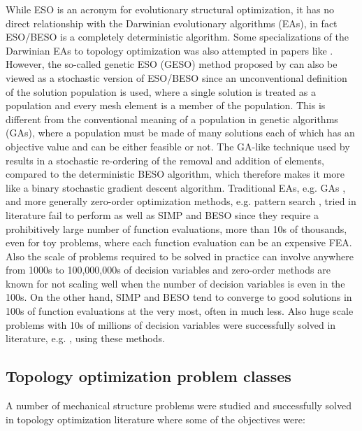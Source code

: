 While ESO is an acronym for evolutionary structural optimization, it has no direct relationship with the Darwinian evolutionary algorithms (EAs), in fact ESO/BESO is a completely deterministic algorithm. Some specializations of the Darwinian EAs to topology optimization was also attempted in papers like \cite{Sandgren1990,Liu2008}. However, the so-called genetic ESO (GESO) method proposed by \cite{Liu2008} can also be viewed as a stochastic version of ESO/BESO since an unconventional definition of the solution population is used, where a single solution is treated as a population and every mesh element is a member of the population. This is different from the conventional meaning of a population in genetic algorithms (GAs), where a population must be made of many solutions each of which has an objective value and can be either feasible or not. The GA-like technique used by \cite{Liu2008} results in a stochastic re-ordering of the removal and addition of elements, compared to the deterministic BESO algorithm, which therefore makes it more like a binary stochastic gradient descent algorithm. Traditional EAs, e.g. GAs \citep{Sandgren1990}, and more generally zero-order optimization methods, e.g. pattern search \citep{Guirguis2016}, tried in literature fail to perform as well as SIMP and BESO since they require a prohibitively large number of function evaluations, more than 10s of thousands, even for toy problems, where each function evaluation can be an expensive FEA. Also the scale of problems required to be solved in practice can involve anywhere from 1000s to 100,000,000s of decision variables and zero-order methods are known for not scaling well when the number of decision variables is even in the 100s. On the other hand, SIMP and BESO tend to converge to good solutions in 100s of function evaluations at the very most, often in much less. Also huge scale problems with 10s of millions of decision variables were successfully solved in literature, e.g. \cite{Aage2015}, using these methods.

\subsection{Topology optimization problem classes}

A number of mechanical structure problems were studied and successfully solved in topology optimization literature where some of the objectives were: 


